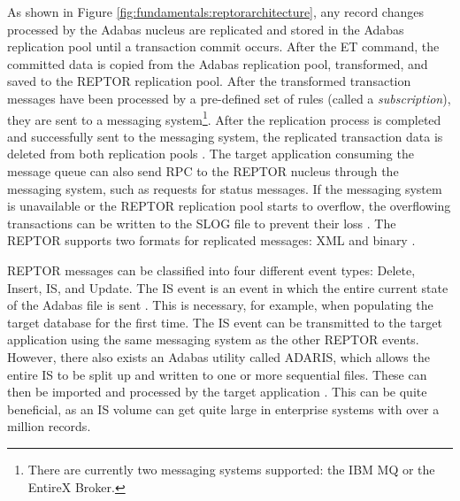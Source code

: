 As shown in Figure \ref{fig:fundamentals:reptorarchitecture}, any record changes processed by the Adabas nucleus are replicated and stored in the Adabas replication pool until a transaction commit occurs. After the \ac{ET} command, the committed data is copied from the Adabas replication pool, transformed, and saved to the \ac{REPTOR} replication pool. After the transformed transaction messages have been processed by a pre-defined set of rules (called a \textit{subscription}), they are sent to a messaging system\footnote{There are currently two messaging systems supported: the IBM MQ or the EntireX Broker.}. After the replication process is completed and successfully sent to the messaging system, the replicated transaction data is deleted from both replication pools \cite{reptorconcepts}. The target application consuming the message queue can also send \ac{RPC} to the \ac{REPTOR} nucleus through the messaging system, such as requests for status messages. If the messaging system is unavailable or the \ac{REPTOR} replication pool starts to overflow, the overflowing transactions can be written to the \ac{SLOG} file to prevent their loss \cite{storr2011reptor}. The \ac{REPTOR} supports two formats for replicated messages: XML and binary \cite{artconcepts}.

\ac{REPTOR} messages can be classified into four different event types: Delete, Insert, \ac{IS}, and Update. The \ac{IS} event is an event in which the entire current state of the Adabas file is sent \cite{reptorprogrammersref}. This is necessary, for example, when populating the target database for the first time. The \ac{IS} event can be transmitted to the target application using the same messaging system as the other \ac{REPTOR} events. However, there also exists an Adabas utility called ADARIS, which allows the entire \ac{IS} to be split up and written to one or more sequential files. These can then be imported and processed by the target application \cite{reptorconcepts}. This can be quite beneficial, as an \ac{IS} volume can get quite large in enterprise systems with over a million records.

